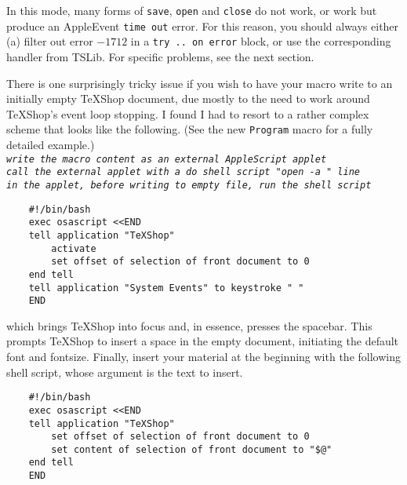 \documentclass[11pt]{amsart}
\def\TeXShop{\TeX Shop\xspace}
\begin{document}
In this mode, many forms of {\tt save}, {\tt open} and {\tt close} do not work, or work but produce an AppleEvent {\tt time out} error. For this reason, you should always either (a) filter out error $-1712$ in a {\tt try .. on error} block, or use the corresponding handler from \textsf{TSLib}.  For specific problems, see the next section. 

There is one surprisingly tricky issue if you wish to have your macro write to an initially empty \TeXShop document, due mostly to the need to work around \TeXShop's event loop stopping. I found I had to resort to a rather complex scheme that looks like the following. (See the new {\tt Program} macro for a fully detailed example.)\\
\texttt{\textit{write the macro content as an external AppleScript applet\\
call the external applet with a do shell script "open -a " line\\
in the applet, before writing to empty file, run the shell script}}
\begin{verbatim}
	#!/bin/bash
	exec osascript <<END
	tell application "TeXShop"
		activate
		set offset of selection of front document to 0
	end tell
	tell application "System Events" to keystroke " "
	END
\end{verbatim}
which brings \TeXShop into focus and, in essence, presses the spacebar. This prompts \TeXShop to insert a space in the empty document,  initiating the default font and fontsize. Finally, insert your material at the beginning with the following shell script, whose argument is the text to insert.
\begin{verbatim}
	#!/bin/bash
	exec osascript <<END
	tell application "TeXShop"
  		set offset of selection of front document to 0
  		set content of selection of front document to "$@"
	end tell
	END
\end{verbatim}
 
\end{document}
